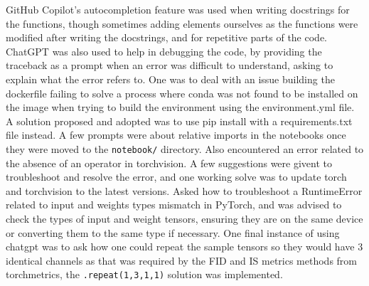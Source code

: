 \documentclass[12pt]{report} %
\begin{document}
GitHub Copilot's autocompletion feature was used when writing docstrings for the functions, though sometimes adding elements ourselves as the functions were modified after writing the docstrings, and for repetitive parts of the code.
ChatGPT was also used to help in debugging the code, by providing the traceback as a prompt when an error was difficult to understand, asking to explain what the error refers to. One was to deal with an issue building the dockerfile failing to solve a process where conda was not found to be installed on the image when trying to build the environment using the environment.yml file. A solution proposed and adopted was to use pip install with a requirements.txt file instead. A few prompts were about relative imports in the notebooks once they were moved to the \texttt{notebook/} directory. Also encountered an error related to the absence of an operator in torchvision. A few suggestions were givent to troubleshoot and resolve the error, and one working solve was to update torch and torchvision to the latest versions. Asked how to troubleshoot a RuntimeError related to input and weights types mismatch in PyTorch, and was advised to check the types of input and weight tensors, ensuring they are on the same device or converting them to the same type if necessary. One final instance of using chatgpt was to ask how one could repeat the sample tensors so they would have 3 identical channels as that was required by the FID and IS metrics methods from torchmetrics, the \texttt{.repeat(1,3,1,1)} solution was implemented.







\end{document}
